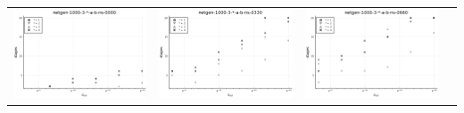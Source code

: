 \documentclass{article}
\begin{document}
\begin{landscape}
\begin{center}
\begin{longtable}{| c | c | c | c |}
                \hline
\includegraphics[height=0.22\textheight]{hiter_fixlim_netgen-1000-3-_-a-b-ns-0000.png} &
\includegraphics[height=0.22\textheight]{hiter_fixlim_netgen-1000-3-_-a-b-ns-0330.png} &
\includegraphics[height=0.22\textheight]{hiter_fixlim_netgen-1000-3-_-a-b-ns-0660.png} &

\end{longtable}
\end{center}
\end{landscape}
\end{document}
